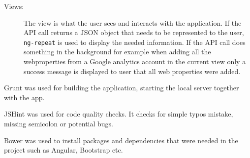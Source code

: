 \begin{description}
\item[Views:] The view is what the user sees and interacts with the application. If the API call returns a JSON object that needs to be represented to the user, \texttt{ng-repeat} is used to display the needed information. If the API call does something in the background for example when adding all the webproperties from a Google analytics account in the current view only a success message is displayed to user that all web properties were added.
\end{description}

Grunt was used for building the application, starting the local server together with the app. 

JSHint was used for code quality checks. It checks for simple typos mistake, missing semicolon or potential bugs.

Bower was used to install packages and dependencies that were needed in the project such as Angular, Bootstrap etc.